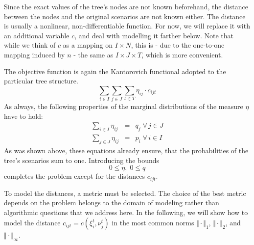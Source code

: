 \documentclass[a4paper, 12pt] {article}
\begin{document}
Since the exact values of the tree's nodes are not known beforehand, the distance between the nodes and the original scenarios are not known either. The distance is usually a nonlinear, non-differentiable function. For now, we will replace it with an additional variable $c$, and deal with modelling it farther below. Note that while we think of $c$ as a mapping on $I\times N$, this is - due to the one-to-one mapping induced by $n$ - the same as $I\times J\times T$, which is more convenient.

The objective function is again the Kantorovich functional adopted to the particular tree structure.
\begin{equation}
  \label{eq:NLP-derivation-objective}
  \sum_{i\in I}\sum_{j\in J}\sum_{t\in T} \eta_{ij}\cdot c_{ijt}
\end{equation}
As always, the following properties of the marginal distributions of the measure $\eta$ have to hold:
\begin{eqnarray}
  \label{eq:eta-nlp-marginal-q}
  \sum_{i\in I}\eta_{ij} &=& q_j \;\forall\, j\in J\\
  \label{eq:eta-nlp-marginal-p}
  \sum_{j\in J}\eta_{ij} &=& p_i \;\forall\, i\in I
\end{eqnarray}
As was shown above, these equations already ensure, that the probabilities of the tree's scenarios sum to one. Introducing the bounds
\begin{equation}
  \label{eq:bounds-nlp-q-eta}
  0 \leq \eta,\; 0\leq q
\end{equation}
completes the problem except for the distances $c_{ijt}$.

To model the distances, a metric must be selected. The choice of the best metric depends on the problem belongs to the domain of modeling rather than algorithmic questions that we address here. In the following, we will show how to model the distance $c_{ijt}=c(\xi_i^t,\nu_j^t)$ in the most common norms $\Vert\cdot\Vert_1$, $\Vert\cdot\Vert_2$, and $\Vert\cdot\Vert_\infty$.
%
\end{document}
